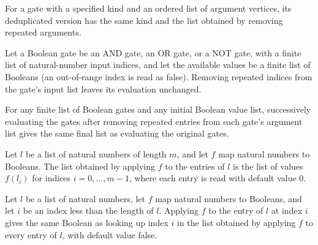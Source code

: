 \begin{definition}
\label{BoolCircuit.DAGGate.dedupArgs}
\leanok
{}
For a gate with a specified kind and an ordered list of argument vertices, its
deduplicated version has the same kind and the list obtained by removing repeated
arguments.
\end{definition}

\begin{theorem}
\label{BoolCircuit.DAGGate.eval_dedupArgs}
\leanok
{}
Let a Boolean gate be an AND gate, an OR gate, or a NOT gate, with a finite list of
natural-number input indices, and let the available values be a finite list of Booleans
(an out-of-range index is read as false). Removing repeated indices from the gate’s
input list leaves its evaluation unchanged.
\end{theorem}

\begin{theorem}
\label{BoolCircuit.runWith_eval_map_dedupArgs}
\leanok
{}
For any finite list of Boolean gates and any initial Boolean value list, successively
evaluating the gates after removing repeated entries from each gate's argument list
gives the same final list as evaluating the original gates.
\end{theorem}

\begin{theorem}
\label{BoolCircuit.ofFn_getD_eq_map}
\leanok
{}
Let $l$ be a list of natural numbers of length $m$, and let $f$ map natural numbers to
Booleans. The list obtained by applying $f$ to the entries of $l$ is the list of values
$f(l_i)$ for indices $i=0,\ldots,m-1$, where each entry is read with default value $0$.
\end{theorem}

\begin{theorem}
\label{BoolCircuit.getD_map_getD}
\leanok
{}
Let $l$ be a list of natural numbers, let $f$ map natural numbers to Booleans, and let
$i$ be an index less than the length of $l$. Applying $f$ to the entry of $l$ at index
$i$ gives the same Boolean as looking up index $i$ in the list obtained by applying $f$
to every entry of $l$, with default value false.
\end{theorem}

